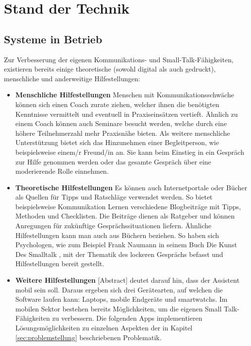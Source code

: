 \chapter{Stand der Technik}
\label{ch:stand_technik}

\section{Systeme in Betrieb}
\label{sec:systeme_betrieb}

Zur Verbesserung der eigenen Kommunikations- und Small-Talk-Fähigkeiten, existieren bereits einige theoretische (sowohl digital als auch gedruckt), menschliche und anderweitige Hilfestellungen:
\begin{itemize}
      \item \textbf{Menschliche Hilfestellungen} \newline
            Menschen mit Kommunikationsschwäche können sich einen Coach zurate ziehen, welcher ihnen die benötigten Kenntnisse vermittelt und eventuell in Praxiseinsätzen vertieft. \newline
            Ähnlich zu einem Coach können auch Seminare besucht werden, welche durch eine höhere Teilnehmerzahl mehr Praxisnähe bieten. \newline
            Als weitere menschliche Unterstützung bietet sich das Hinzunehmen einer Begleitperson, wie beispielsweise einem/r Freund/in an. Sie kann beim Einstieg in ein Gespräch zur Hilfe genommen werden oder das gesamte Gespräch über eine moderierende Rolle einnehmen.
      \item \textbf{Theoretische Hilfestellungen} \newline
            Es können auch Internetportale oder Bücher als Quellen für Tipps und Ratschläge verwendet werden. So bietet beispielsweise \glqq Kommunikation Lernen\grqq{} \cite{Kommunikationlernen:blog} verschiedene Blogbeiträge mit Tipps, Methoden und Checklisten. Die Beiträge dienen als Ratgeber und können Anregungen für zukünftige Gesprächssituationen liefern. \newline
            Ähnliche Hilfestellungen kann man auch aus Büchern beziehen. So haben sich Psychologen, wie zum Beispiel Frank Naumann in seinem Buch \glqq Die Kunst Des Smalltalk\grqq{} \cite{Naumann:Die-kunst-des-smalltalk}, mit der Thematik des lockeren Gesprächs befasst und Hilfestellungen bereit gestellt.
      \item \textbf{Weitere Hilfestellungen} \newline
             [Abstract] deutet darauf hin, dass der Assistent mobil sein soll. Daraus ergeben sich drei Gerätearten, auf welchen die Software laufen kann: Laptops, mobile Endgeräte und \glspl{smartwatch}. Im mobilen Sektor bestehen bereits Möglichkeiten, um die eigenen Small Talk-Fähigkeiten zu verbessern. Die folgenden Apps implementieren Lösungsmöglichkeiten zu einzelnen Aspekten der in Kapitel \ref{sec:problemstellung} beschriebenen Problematik.

\end{itemize}
